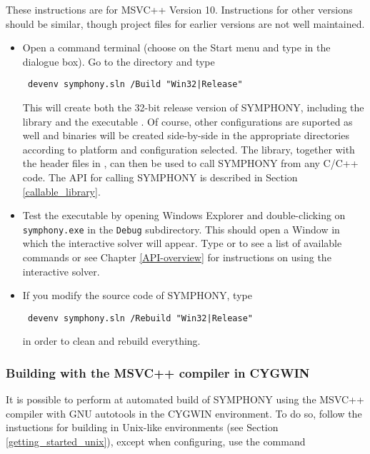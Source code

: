 These instructions are for MSVC++ Version 10. Instructions for other versions
should be similar, though project files for earlier versions are not well
maintained. 

\begin{itemize}
\item Open a command terminal (choose  on the Start menu and type
 in the dialogue box). Go to the 
directory and type 
{\color{Brown}
\begin{verbatim}
 devenv symphony.sln /Build "Win32|Release"
\end{verbatim}
}This will create both the 32-bit release version of SYMPHONY, including the
library  and the executable . Of course,
other configurations are suported as well and binaries will be created
side-by-side in the appropriate directories according to platform and
configuration selected. The library, together with the header files in
, can then be used to call SYMPHONY from any
C/C++ code. The API for calling SYMPHONY is described in Section
\ref{callable_library}.

\item Test the executable by opening Windows Explorer and double-clicking
on {\color{Brown}\texttt{symphony.exe}} in the
{\color{Brown}\texttt{Debug\bs}} subdirectory. This should open a Window in
which the interactive solver will appear. Type  or  to see
a list of available commands or see Chapter
\ref{API-overview} for instructions on using the interactive solver.

\item If you modify the source code of SYMPHONY, type 
{\color{Brown}
\begin{verbatim}
 devenv symphony.sln /Rebuild "Win32|Release"
\end{verbatim}
}
in order to clean and rebuild everything.
\end{itemize} 

\subsubsection{Building with the MSVC++ compiler in CYGWIN}

It is possible to perform at automated build of SYMPHONY using the MSVC++
compiler  with GNU autotools in the CYGWIN environment. To do so,
follow the instuctions for building in Unix-like environments (see Section
\ref{getting_started_unix}), except when configuring, use the command

